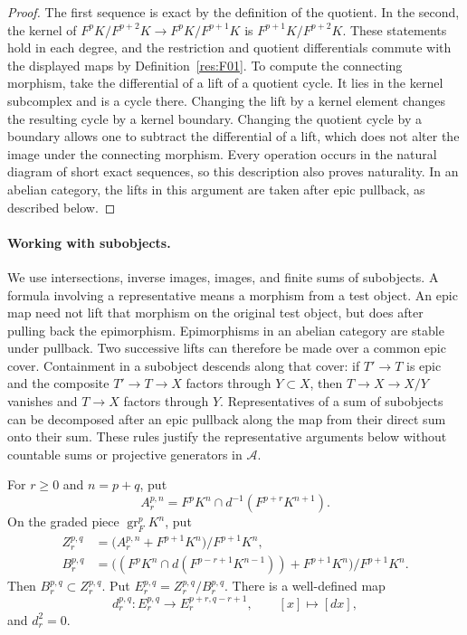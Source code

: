 \begin{proof}
The first sequence is exact by the definition of the quotient. In the
second, the kernel of $F^pK/F^{p+2}K\to F^pK/F^{p+1}K$ is
$F^{p+1}K/F^{p+2}K$. These statements hold in each degree, and the
restriction and quotient differentials commute with the displayed maps
by Definition~\ref{res:F01}. To compute the connecting morphism, take the
differential of a lift of a quotient cycle. It lies in the kernel
subcomplex and is a cycle there. Changing the lift by a kernel element
changes the resulting cycle by a kernel boundary. Changing the quotient
cycle by a boundary allows one to subtract the differential of a lift,
which does not alter the image under the connecting morphism. Every
operation occurs in the natural diagram of short exact sequences, so
this description also proves naturality. In an abelian category,
the lifts in this argument are taken after epic pullback, as described
below.
\end{proof}

\paragraph{Working with subobjects.}
We use intersections, inverse images, images, and finite sums of
subobjects. A formula involving a representative means a morphism
from a test object. An epic map need not lift that morphism on the
original test object, but does after pulling back the epimorphism.
Epimorphisms in an abelian category are stable under pullback. Two
successive lifts can therefore be made over a common epic cover.
Containment in a subobject descends along that cover: if $T'\to T$
is epic and the composite $T'\to T\to X$ factors through $Y\subset X$,
then $T\to X\to X/Y$ vanishes and $T\to X$ factors through $Y$.
Representatives of a sum of subobjects can be decomposed after an
epic pullback along the map from their direct sum onto their sum.
These rules justify the representative arguments below without
countable sums or projective generators in $\mathcal A$.

\begin{proposition}
\label{res:F03}
For $r\geq 0$ and $n=p+q$, put
\[
 A_r^{p,n}=F^pK^n\cap d^{-1}(F^{p+r}K^{n+1}).
\]
On the graded piece $\operatorname{gr}_F^pK^n$, put
\begin{align*}
 Z_r^{p,q}
   &=\bigl(A_r^{p,n}+F^{p+1}K^n\bigr)/F^{p+1}K^n,\\
 B_r^{p,q}
   &=\bigl((F^pK^n\cap d(F^{p-r+1}K^{n-1}))+F^{p+1}K^n\bigr)
      /F^{p+1}K^n.
\end{align*}
Then $B_r^{p,q}\subset Z_r^{p,q}$. Put $E_r^{p,q}=Z_r^{p,q}/B_r^{p,q}$.
There is a well-defined map
\[
 d_r^{p,q}\colon E_r^{p,q}\longrightarrow E_r^{p+r,q-r+1},
 \qquad [x]\longmapsto [dx],
\]
and $d_r^2=0$.
\end{proposition}

